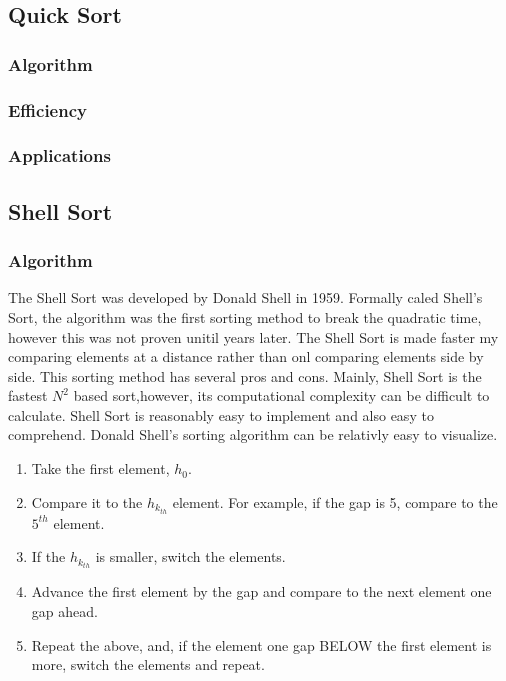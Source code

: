 \documentclass{article}
\begin{document}
   \subsection{Quick Sort}
      \subsubsection{Algorithm}
      \subsubsection{Efficiency}
      \subsubsection{Applications}
   \subsection{Shell Sort}
   \subsubsection{Algorithm}
        The Shell Sort was developed by Donald Shell in 1959. Formally caled
        Shell's Sort, the algorithm was the first sorting method to break the 
        quadratic time, however this was not proven unitil years later. The 
        Shell Sort is made faster my comparing elements at a distance rather 
        than onl comparing elements side by side. This sorting method has
        several pros and cons\cite{introalg}. Mainly, Shell Sort is the
        fastest $N^2$ based sort,however, its computational complexity can be
        difficult to calculate\cite{princton}. Shell Sort is reasonably easy to
        implement and also easy to comprehend. 
        Donald Shell's sorting algorithm can be relativly easy to visualize.
        \begin{enumerate}
            \item Take the first element, $h_0$.
            \item Compare it to the $h_{k_{th}}$ element. For example, if the 
            gap is 5, compare to the $5^{th}$ element. 
            \item If the $h_{k_{th}}$ is smaller, switch the elements.
            \item Advance the first element by the gap and compare to the next 
            element one gap ahead.
            \item Repeat the above, and, if the element one gap BELOW the first
            element is more, switch the elements and repeat.
        \end{enumerate}
\end{document}

